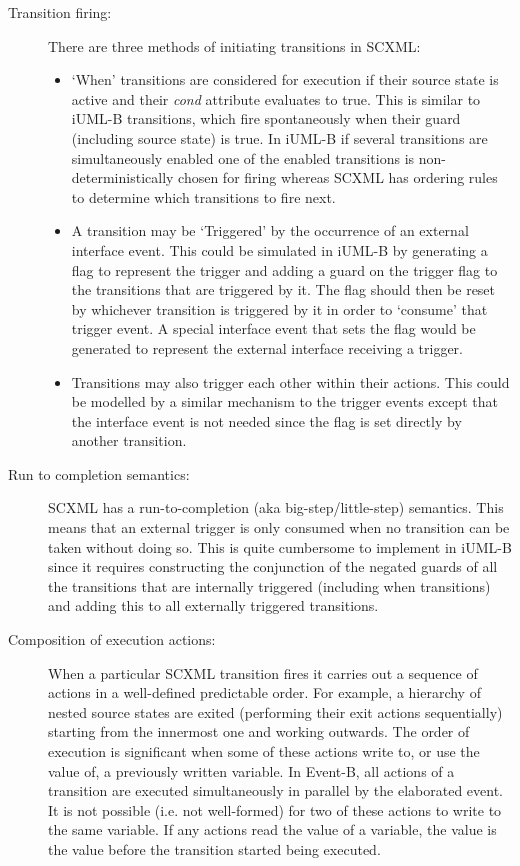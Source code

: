 \begin{description}

\item [Transition firing:]

There are three methods of initiating transitions in SCXML:
\begin{itemize}
\item `When' transitions are considered for execution if their source state is active and their \emph{cond} attribute evaluates to true. 
This is similar to iUML-B transitions, which fire spontaneously when their guard (including source state) is true.
In iUML-B if several transitions are simultaneously enabled one of the enabled transitions is non-deterministically chosen for firing whereas 
SCXML has ordering rules to determine which transitions to fire next.
\item A transition may be `Triggered' by the occurrence of an external interface event. 
This could be simulated in iUML-B by generating a flag to represent the trigger and adding a guard on the trigger flag to the transitions that are triggered by it. 
The flag should then be reset by whichever transition is triggered by it in order to `consume' that trigger event.
 A special interface event that sets the flag would be generated to represent the external interface receiving a trigger.
\item Transitions may also trigger each other within their actions. 
This could be modelled by a similar mechanism to the trigger events except that the interface event is not needed since the flag is set directly by another transition.
\end{itemize}

\item [Run to completion semantics:] 
SCXML has a run-to-completion (aka big-step/little-step) semantics.
 This means that an external trigger is only consumed when no transition can be taken without doing so. 
This is quite cumbersome to implement in iUML-B since it requires constructing the conjunction of the negated guards of all the transitions that are internally triggered (including when transitions) and adding this to all externally triggered transitions.

\item [Composition of execution actions:]
When a particular SCXML transition fires it carries out a sequence of actions in a well-defined predictable order. 
For example, a hierarchy of nested source states are exited (performing their exit actions sequentially) starting from the innermost one and working outwards.
The order of execution is significant when some of these actions write to, or use the value of, a previously written variable. 
In Event-B, all actions of a transition are executed simultaneously in parallel by the elaborated event. 
It  is not possible (i.e. not well-formed) for two of these actions to write to the same variable.
If any actions read the value of a variable, the value is the value before the transition started being executed.


\end{description}
